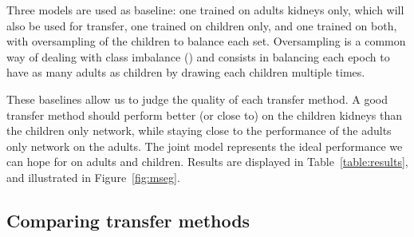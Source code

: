 Three models are used as baseline: one trained on adults kidneys only, which will also be used for transfer, one trained on children only, and one trained on both, with oversampling of the children to balance each set. Oversampling is a common way of dealing with class imbalance (\textcite{buda2017}) and consists in balancing each epoch to have as many adults as children by drawing each children multiple times.

These baselines allow us to judge the quality of each transfer method. A good transfer method should perform better (or close to) on the children kidneys than the children only network, while staying close to the performance of the adults only network on the adults. The joint model represents the ideal performance we can hope for on adults and children. Results are displayed in Table~\ref{table:results}, and illustrated in Figure~\ref{fig:mseg}.

\subsection{Comparing transfer methods}


